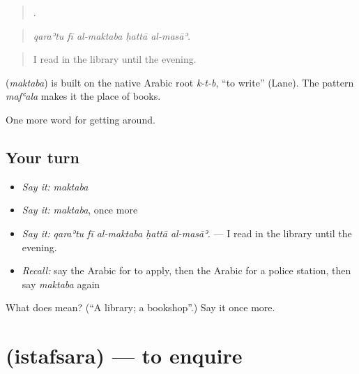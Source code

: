 \begin{quote}
    .
\end{quote}

\begin{quote}
\emph{qaraʾtu fī al-maktaba ḥattā al-masāʾ.}
\end{quote}

\begin{quote}
I read in the library until the evening.
\end{quote}

\begin{cousinweb}
\textbf{} (\emph{maktaba}) is built on the native Arabic root \emph{k-t-b}, \textquotedblleft{}to write\textquotedblright{} (Lane). The pattern \emph{mafʿala} makes it the place of books.
\end{cousinweb}

\begin{grammarlens}[title={What you've built}]
One more word for getting around.
\end{grammarlens}

\subsection*{Your turn}
\begin{itemize}
\raggedright
  \item \emph{Say it:} \emph{maktaba}
  \item \emph{Say it:} \emph{maktaba}, once more
  \item \emph{Say it:} \emph{qaraʾtu fī al-maktaba ḥattā al-masāʾ.} — I read in the library until the evening.
  \item \emph{Recall:} say the Arabic for to apply, then the Arabic for a police station, then say \emph{maktaba} again
\end{itemize}

\begin{tcolorbox}[breakable,colback=teal!4,colframe=teal!35!black,title={Before you move on}]
What does  mean? (\textquotedblleft{}A library; a bookshop\textquotedblright{}.) Say it once more.
\end{tcolorbox}
\section[\texorpdfstring{\ar{استفسر} (istafsara)}{استفسر (istafsara)}]{ (istafsara) — to enquire}

\label{lesson:AR-C451-istafsara}



